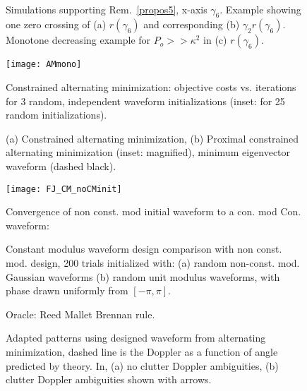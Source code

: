 \documentclass[11pt,draftclsnofoot,onecolumn]{IEEEtran}
\theoremstyle{definition}
\theoremstyle{remark}
\begin{document}
\begin{figure*}[htbp!]
\centering
   \\
\caption{ Simulations supporting Rem.~\ref{propos5}, x-axis $\gamma_6$. Example showing one zero crossing of (a) $r(\gamma_6)$ and corresponding (b) $\gamma_2r(\gamma_6)$. Monotone decreasing example for $P_o>>\kappa^2$ in (c) $r(\gamma_6)$.}
\label{lagrasupport2}
\end{figure*}

\begin{figure}[htbp!]
\centering
\texttt{[image: AMmono]}
\caption{Constrained alternating minimization: objective costs vs. iterations for 3 random, independent waveform initializations (inset: for 25 random initializations).}
\label{fig4}
\end{figure}
\begin{figure*}[htbp!]
\centering
\caption{(a) Constrained alternating minimization, (b) Proximal constrained alternating minimization (inset: magnified), minimum eigenvector waveform (dashed black).}
\label{fig5}
\end{figure*}
\begin{figure}[htbp!]
\centering
  \texttt{[image: FJ\_CM\_noCMinit]} 
\caption{Convergence of non const. mod initial waveform to  a con. mod Con.  waveform:}
\label{fig6}
\end{figure}
\begin{figure*}[htbp!]
\centering
\caption{Constant modulus waveform design comparison with non const. mod. design, 200 trials initialized with: (a) random non-const. mod. Gaussian waveforms (b) random unit modulus waveforms, with phase drawn uniformly from $[-\pi,\pi]$.  }
\label{fig7}
\end{figure*}
\begin{figure}[htbp!]
\centering
\caption{Oracle: Reed Mallet Brennan rule.}
\label{fig8}
\end{figure}
\begin{figure}[htbp!]
\centering
\caption{Adapted patterns using designed waveform from alternating minimization, dashed line is the Doppler as a function of angle predicted by theory. In, (a) no clutter Doppler ambiguities, (b) clutter Doppler ambiguities shown with arrows.}
\label{fig9}
\end{figure}
\end{document}
